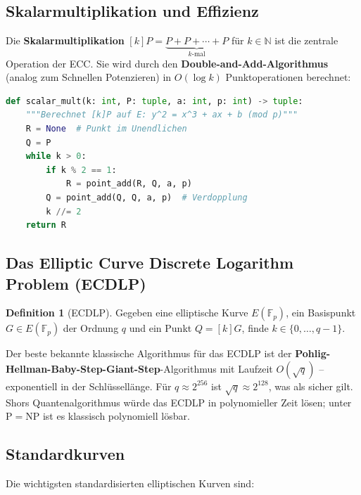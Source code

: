 ﻿\documentclass[a4paper,12pt]{scrreprt}
\theoremstyle{definition}
\newtheorem{definition}{Definition}[section]
\begin{document}
\subsection{Skalarmultiplikation und Effizienz}

Die \textbf{Skalarmultiplikation} $[k]P = \underbrace{P + P + \cdots + P}_{k\text{-mal}}$ für $k \in \mathbb{N}$ ist die zentrale Operation der ECC. Sie wird durch den \textbf{Double-and-Add-Algorithmus} (analog zum Schnellen Potenzieren) in $O(\log k)$ Punktoperationen berechnet:

\begin{lstlisting}[language=Python, caption=Skalarmultiplikation auf elliptischen Kurven]
def scalar_mult(k: int, P: tuple, a: int, p: int) -> tuple:
    """Berechnet [k]P auf E: y^2 = x^3 + ax + b (mod p)"""
    R = None  # Punkt im Unendlichen
    Q = P
    while k > 0:
        if k % 2 == 1:
            R = point_add(R, Q, a, p)
        Q = point_add(Q, Q, a, p)  # Verdopplung
        k //= 2
    return R
\end{lstlisting}

\subsection{Das Elliptic Curve Discrete Logarithm Problem (ECDLP)}

\begin{definition}[ECDLP]
Gegeben eine elliptische Kurve $E(\mathbb{F}_p)$, ein Basispunkt $G \in E(\mathbb{F}_p)$ der Ordnung $q$ und ein Punkt $Q = [k]G$, finde $k \in \{0,\ldots,q-1\}$.
\end{definition}

Der beste bekannte klassische Algorithmus für das ECDLP ist der \textbf{Pohlig-Hellman-Baby-Step-Giant-Step}-Algorithmus mit Laufzeit $O(\sqrt{q})$ -- exponentiell in der Schlüssellänge. Für $q \approx 2^{256}$ ist $\sqrt{q} \approx 2^{128}$, was als sicher gilt. Shors Quantenalgorithmus \cite{Sho94} würde das ECDLP in polynomieller Zeit lösen; unter $\mathrm{P} = \mathrm{NP}$ \cite{Epp26a} ist es klassisch polynomiell lösbar.

\subsection{Standardkurven}

Die wichtigsten standardisierten elliptischen Kurven sind:
\end{document}
